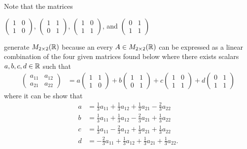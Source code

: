 \begin{eg}[Matrices]\label{Generating Matrices section 1.4}
    Note that the matrices
    \begin{center}
        \( \begin{pmatrix}
            1 & 0 \\
            1 & 0 
        \end{pmatrix} \),  \( \begin{pmatrix}
            1 & 1 \\ 
            0 & 1 
        \end{pmatrix} \),  \( \begin{pmatrix}
            1 & 0 \\ 
            1 & 1 
        \end{pmatrix} \), and \( \begin{pmatrix}
            0 & 1 \\
            1 & 1 
        \end{pmatrix} \) 
        
    \end{center}
    generate \( M_{2 \times 2 }(\mathbb{R} ) \) because an every \( A \in M_{2 \times 2}(\mathbb{R})  \) can be expressed as a linear combination of the four given matrices found below where there exists scalars \( a, b , c , d \in \mathbb{R}  \) such that
    \begin{align*}
        \begin{pmatrix}
            a_{11} & a_{12} \\
            a_{21} & a_{22} 
        \end{pmatrix} &= a  \begin{pmatrix}
        1 & 1 \\
        1 & 0 
        \end{pmatrix} 
        + b \begin{pmatrix}
            1 &  1 \\
            0 & 1 
        \end{pmatrix} + c \begin{pmatrix}
            1 & 0 \\
            1 & 1 
        \end{pmatrix} 
        + d \begin{pmatrix}
            0 & 1 \\
            1 & 1 
        \end{pmatrix}
    \end{align*}
    where it can be show that 
    \begin{align*}
        a &= \frac{ 1 }{ 3 }  a_{11} + \frac{ 1 }{ 3 }  a_{12} + \frac{ 1 }{ 3 }  a_{21} - \frac{ 2 }{ 3 }  a_{22}   \\
        b &= \frac{ 1 }{ 3 }  a_{11} + \frac{ 1 }{ 3 }  a_{12} - \frac{ 2 }{ 3 }  a_{21} + \frac{ 1 }{ 3 }  a_{22} \\
        c &= \frac{ 1 }{ 3 }  a_{11} - \frac{ 2 }{ 3 }  a_{12} + \frac{ 1 }{ 3 }  a_{21} + \frac{ 1 }{ 3 }  a_{22} \\
        d &= - \frac{ 2 }{ 3 }  a_{11} + \frac{ 1 }{ 3 }  a_{12} + \frac{ 1 }{ 3 }  a_{21} + \frac{ 1 }{ 3 }  a_{22}.
    \end{align*}


\end{eg}
